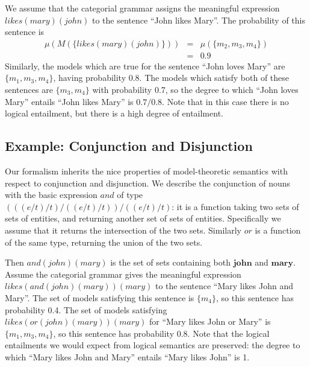 \documentclass{svmult}
\begin{document}
We assume that the categorial grammar assigns the meaningful
expression $\mathit{likes}(\mathit{mary})(\mathit{john})$ to the
sentence ``John likes Mary''. The probability of this sentence is
\begin{eqnarray*}
\mu(M(\{\mathit{likes}(\mathit{mary})(\mathit{john})\})) &=&
\mu(\{m_2, m_3, m_4\})\\
&=&0.9
\end{eqnarray*}
Similarly, the models which are true for the sentence ``John loves
Mary'' are $\{m_1, m_3, m_4\}$, having probability 0.8. The models
which satisfy both of these sentences are $\{m_3, m_4\}$ with
probability 0.7, so the
degree to which ``John loves Mary'' entails ``John likes Mary'' is
$0.7/0.8$. Note that in this case there is no logical entailment, but
there is a high degree of entailment.

\subsection{Example: Conjunction and Disjunction}

Our formalism inherits the nice properties of model-theoretic
semantics with respect to conjunction and disjunction. We describe the
conjunction of nouns with the basic expression $\mathit{and}$ of type
$(((e/t)/t)/((e/t)/t))/((e/t)/t)$: it is a function taking two sets of
sets of entities, and returning another set of sets of
entities. Specifically we assume that it returns the intersection of
the two sets. Similarly $\mathit{or}$ is a function of the same type,
returning the union of the two sets.

Then $\mathit{and}(john)(mary)$ is the set of sets containing both
$\mathbf{john}$ and $\mathbf{mary}$. Assume the categorial grammar
gives the meaningful expression
$\mathit{likes}(\mathit{and}(\mathit{john})(\mathit{mary}))(\mathit{mary})$
to the sentence ``Mary likes John and Mary''. The set of models
satisfying this sentence is $\{m_4\}$, so this sentence has
probability 0.4. The set of models satisfying
$\mathit{likes}(\mathit{or}(\mathit{john})(\mathit{mary}))(\mathit{mary})$
for ``Mary likes John or Mary'' is $\{m_1, m_3, m_4\}$, so this
sentence has probability 0.8. Note that the logical entailments we
would expect from logical semantics are preserved: the degree to which
``Mary likes John and Mary'' entails ``Mary likes John'' is 1.

\end{document}
